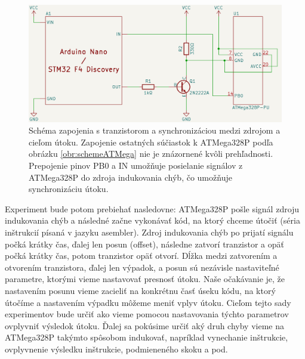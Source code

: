 \begin{figure}
    \centerline{\includegraphics[width=1\textwidth]{images/schemeExpTranz.png}}
    \caption[Schéma zapojenia s tranzistorom a synchronizáciou]{Schéma zapojenia s tranzistorom a synchronizáciou medzi zdrojom a cieľom útoku. Zapojenie ostatných súčiastok k ATMega328P podľa obrázku \ref{obr:schemeATMega} nie je znázornené kvôli prehľadnosti. Prepojenie pinov PB0 a IN umožňuje posielanie signálov z ATMega328P do zdroja indukovania chýb, čo umožňuje synchronizáciu útoku.}
    \label{obr:schemeExpTranz}
\end{figure}

Experiment bude potom prebiehať nasledovne: ATMega328P pošle signál zdroju indukovania chýb a následné začne vykonávať kód, na ktorý chceme útočiť (séria inštrukcií písaná v jazyku asembler). Zdroj indukovania chýb po prijatí signálu počká krátky čas, ďalej len posun (offset), následne zatvorí tranzistor a opäť počká krátky čas, potom tranzistor opäť otvorí. Dĺžka medzi zatvorením a otvorením tranzistora, ďalej len výpadok, a posun sú nezávisle nastaviteľné parametre, ktorými vieme nastavovať presnosť útoku. Naše očakávanie je, že nastavením posunu vieme zacieliť na konkrétnu časť úseku kódu, na ktorý útočíme a nastavením výpadku môžeme meniť vplyv útoku. Cieľom tejto sady experimentov bude určiť ako vieme pomocou nastavovania týchto parametrov ovplyvniť výsledok útoku. Ďalej sa pokúsime určiť aký druh chyby vieme na ATMega328P takýmto spôsobom indukovať, napríklad vynechanie inštrukcie, ovplyvnenie výsledku inštrukcie, podmieneného skoku a pod.

